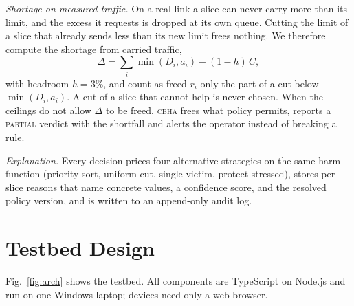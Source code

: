 \documentclass[conference]{IEEEtran}
\newcommand{\cbha}{\textsc{cbha}}
\begin{document}
\textit{Shortage on measured traffic.} On a real link a slice can never carry more than its limit, and the excess it requests is dropped at its own queue. Cutting the limit of a slice that already sends less than its new limit frees nothing. We therefore compute the shortage from carried traffic,
\begin{equation}
\Delta = \textstyle\sum_i \min(D_i, a_i) - (1-h)\,C ,
\end{equation}
with headroom $h = 3\%$, and count as freed $r_i$ only the part of a cut below $\min(D_i, a_i)$. A cut of a slice that cannot help is never chosen. When the ceilings do not allow $\Delta$ to be freed, \cbha{} frees what policy permits, reports a \textsc{partial} verdict with the shortfall and alerts the operator instead of breaking a rule.

\textit{Explanation.} Every decision prices four alternative strategies on the same harm function (priority sort, uniform cut, single victim, protect-stressed), stores per-slice reasons that name concrete values, a confidence score, and the resolved policy version, and is written to an append-only audit log.

\section{Testbed Design}
\label{sec:testbed}

Fig.~\ref{fig:arch} shows the testbed. All components are TypeScript on Node.js and run on one Windows laptop; devices need only a web browser.
\end{document}
